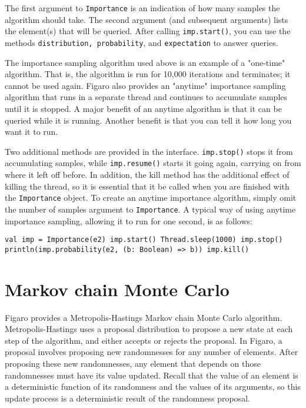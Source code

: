 The first argument to \texttt{Importance} is an indication of how many samples the algorithm should take. The second argument (and subsequent arguments) lists the element(s) that will be queried. After calling \texttt{imp.start()}, you can use the methods \texttt{distribution, probabil\-ity}, and \texttt{expectation} to answer queries.

The importance sampling algorithm used above is an example of a "one-time" algorithm. That is, the algorithm is run for 10,000 iterations and terminates; it cannot be used again. Figaro also provides an "anytime" importance sampling algorithm that runs in a separate thread and continues to accumulate samples until it is stopped. A major benefit of an anytime algorithm is that it can be queried while it is running. Another benefit is that you can tell it how long you want it to run.

Two additional methods are provided in the interface. \texttt{imp.stop()} stops it from accumulating samples, while \texttt{imp.resume()} starts it going again, carrying on from where it left off before. In addition, the kill method has the additional effect of killing the thread, so it is essential that it be called when you are finished with the \texttt{Importance} object. To create an anytime importance algorithm, simply omit the number of samples argument to \texttt{Importance}. A typical way of using anytime importance sampling, allowing it to run for one second, is as follows:

\begin{flushleft}
\texttt{val imp = Importance(e2) 
\newline imp.start() 
\newline Thread.sleep(1000) 
\newline imp.stop()
\newline println(imp.probability(e2, (b: Boolean) => b))
\newline imp.kill() }
\end{flushleft}

\section{Markov chain Monte Carlo}

Figaro provides a Metropolis-Hastings Markov chain Monte Carlo algorithm. Metropolis-Hastings uses a proposal distribution to propose a new state at each step of the algorithm, and either accepts or rejects the proposal. In Figaro, a proposal involves proposing new randomnesses for any number of elements. After proposing these new randomnesses, any element that depends on those randomnesses must have its value updated. Recall that the value of an element is a deterministic function of its randomness and the values of its arguments, so this update process is a deterministic result of the randomness proposal.


